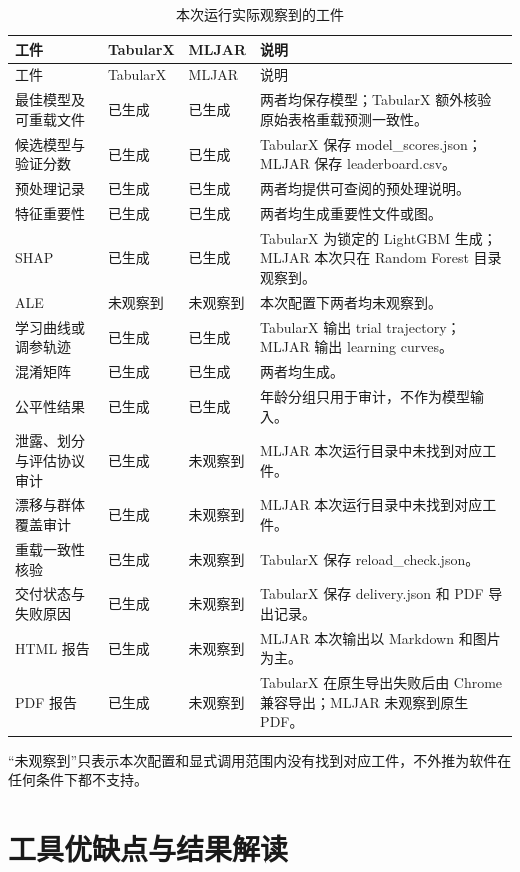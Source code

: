 \documentclass[degree=bachelor,language=chinese,fontset=fandol]{thuthesis}
\newcommand{\yes}{\textcolor{green!50!black}{已生成}}
\newcommand{\no}{\textcolor{red!70!black}{未观察到}}
\begin{document}
\begin{longtable}{>{\raggedright\arraybackslash}p{}p{}p{}>{\raggedright\arraybackslash}p{}}
  \caption{本次运行实际观察到的工件}\label{tab:artifacts}\\
  \toprule
  工件 & TabularX & MLJAR & 说明 \\
  \midrule
  \endfirsthead
  \toprule
  工件 & TabularX & MLJAR & 说明 \\
  \midrule
  \endhead
  最佳模型及可重载文件 & \yes & \yes & 两者均保存模型；TabularX 额外核验原始表格重载预测一致性。\\
  候选模型与验证分数 & \yes & \yes & TabularX 保存 model\_scores.json；MLJAR 保存 leaderboard.csv。\\
  预处理记录 & \yes & \yes & 两者均提供可查阅的预处理说明。\\
  特征重要性 & \yes & \yes & 两者均生成重要性文件或图。\\
  SHAP & \yes & \yes & TabularX 为锁定的 LightGBM 生成；MLJAR 本次只在 Random Forest 目录观察到。\\
  ALE & \no & \no & 本次配置下两者均未观察到。\\
  学习曲线或调参轨迹 & \yes & \yes & TabularX 输出 trial trajectory；MLJAR 输出 learning curves。\\
  混淆矩阵 & \yes & \yes & 两者均生成。\\
  公平性结果 & \yes & \yes & 年龄分组只用于审计，不作为模型输入。\\
  泄露、划分与评估协议审计 & \yes & \no & MLJAR 本次运行目录中未找到对应工件。\\
  漂移与群体覆盖审计 & \yes & \no & MLJAR 本次运行目录中未找到对应工件。\\
  重载一致性核验 & \yes & \no & TabularX 保存 reload\_check.json。\\
  交付状态与失败原因 & \yes & \no & TabularX 保存 delivery.json 和 PDF 导出记录。\\
  HTML 报告 & \yes & \no & MLJAR 本次输出以 Markdown 和图片为主。\\
  PDF 报告 & \yes & \no & TabularX 在原生导出失败后由 Chrome 兼容导出；MLJAR 未观察到原生 PDF。\\
  \bottomrule
\end{longtable}

“未观察到”只表示本次配置和显式调用范围内没有找到对应工件，不外推为软件在任何条件下都不支持。

\chapter{工具优缺点与结果解读}
\end{document}

